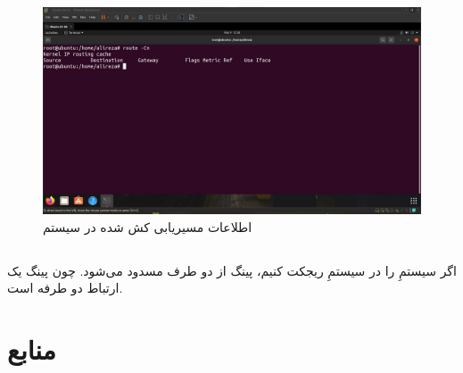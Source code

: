 \documentclass{article}
\begin{document}
\subsection{}
\begin{figure}[H]
    \centering
    \includegraphics[width=1.0\textwidth]{figures/8c.jpg}
    \caption
	{
اطلاعات مسیریابی کش شده در سیستم
	}
    \label{fig:fig1}
\end{figure}

\subsection{}
اگر سیستمِ  را در سیستمِ  ریجکت کنیم، پینگ از دو طرف مسدود می‌شود. چون پینگ یک ارتباط دو طرفه است.



\section*{منابع}
\renewcommand{\section}[2]{}%
\begin{thebibliography}{99} %


\begin{LTRitems}

\resetlatinfont

\end{LTRitems}

\end{thebibliography}
\end{document}
